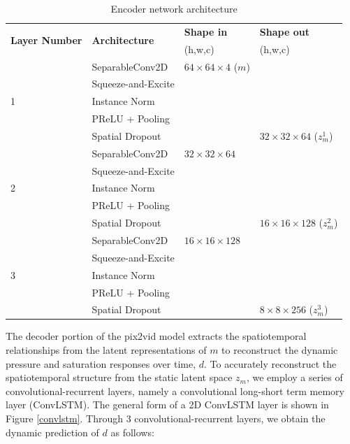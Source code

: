 \documentclass[10pt, twoside]{article}
\begin{document}
\begin{table}[t]
    \caption{Encoder network architecture}\label{tab1}
    \centering
    \begin{tabular}{@{} llll @{} }
    \toprule
        \multirow{2}{*}{\textbf{Layer Number}} & \multirow{2}{*}{\textbf{Architecture}} & \textbf{Shape in} & \textbf{Shape out} \\
         &    & (h,w,c)   & (h,w,c)            \\
    \midrule
        \multirow{5}{*}{1} & SeparableConv2D    &  $64\times64\times4$ ($m$) & \\
                           & Squeeze-and-Excite &  &  \\
                           & Instance Norm      &  &  \\
                           & PReLU + Pooling    &  &  \\
                           & Spatial Dropout    &  & $32\times32\times64$ ($z_m^1$) \\
        \hline                      
        \multirow{5}{*}{2} & SeparableConv2D    & $32\times32\times64$ & \\
                           & Squeeze-and-Excite & & \\
                           & Instance Norm      & & \\
                           & PReLU + Pooling    & & \\
                           & Spatial Dropout    & & $16\times16\times128$ ($z_m^2$) \\
        \hline
        \multirow{5}{*}{3} & SeparableConv2D    & $16\times16\times128$ & \\
                           & Squeeze-and-Excite & & \\
                           & Instance Norm      & & \\
                           & PReLU + Pooling    & & \\
                           & Spatial Dropout    & & $8\times8\times256$  ($z_m^3$) \\
    \bottomrule
    \end{tabular}
\end{table}

The decoder portion of the pix2vid model extracts the spatiotemporal relationships from the latent representations of $m$ to reconstruct the dynamic pressure and saturation responses over time, $d$. To accurately reconstruct the spatiotemporal structure from the static latent space $z_m$, we employ a series of convolutional-recurrent layers, namely a convolutional long-short term memory layer (ConvLSTM). The general form of a 2D ConvLSTM layer is shown in Figure \ref{convlstm}. Through 3 convolutional-recurrent layers, we obtain the dynamic prediction of $d$ as follows:
\end{document}
